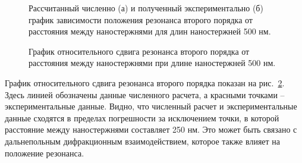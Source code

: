 \begin{figure}
\caption{Рассчитанный численно (а) и полученный экспериментально (б) график зависимости положения резонанса второго порядка от расстояния между наностержнями для длин наностержней 500 нм. }
\label{img:a500simexp}
\end{figure}
\begin{figure}
\caption{График относительного сдвига резонанса второго порядка от расстояния между наностержнями при длине наностержней 500 нм.}
\label{img:a500shift}
\end{figure}

График относительного сдвига резонанса второго порядка показан на рис.~\ref{img:a500shift}. Здесь линией обозначены данные численного расчета, а красными точками -- экспериментальные данные. Видно, что численный расчет и экспериментальные данные сходятся в пределах погрешности за исключением точки, в которой расстояние между наностержнями составляет 250 нм. Это может быть связано с дальнепольным дифракционным взаимодействием, которое также влияет на положение резонанса.

